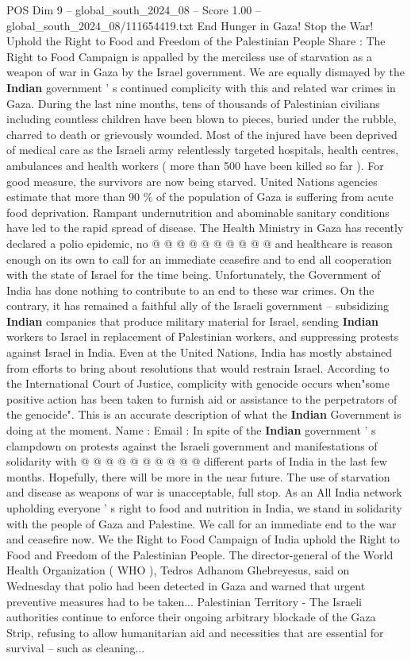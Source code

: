 \begin{textsample}{POS Dim 9 – global\_south\_2024\_08 – Score 1.00 – global\_south\_2024\_08/111654419.txt}  \label{ex:f9_pos_060}
End Hunger in Gaza!
Stop the War!
Uphold the Right to Food and Freedom of the Palestinian People Share : The Right to Food Campaign is appalled by the merciless use of starvation as a weapon of war in Gaza by the Israel government.
We are equally dismayed by the \textbf{Indian} government ' s continued complicity with this and related war crimes in Gaza.
During the last nine months, tens of thousands of Palestinian civilians including countless children have been blown to pieces, buried under the rubble, charred to death or grievously wounded.
Most of the injured have been deprived of medical care as the Israeli army relentlessly targeted hospitals, health centres, ambulances and health workers ( more than 500 have been killed so far ).
For good measure, the survivors are now being starved.
United Nations agencies estimate that more than 90 \% of the population of Gaza is suffering from acute food deprivation.
Rampant undernutrition and abominable sanitary conditions have led to the rapid spread of disease.
The Health Ministry in Gaza has recently declared a polio epidemic, no @ @ @ @ @ @ @ @ @ @ and healthcare is reason enough on its own to call for an immediate ceasefire and to end all cooperation with the state of Israel for the time being.
Unfortunately, the Government of India has done nothing to contribute to an end to these war crimes.
On the contrary, it has remained a faithful ally of the Israeli government -- subsidizing \textbf{Indian} companies that produce military material for Israel, sending \textbf{Indian} workers to Israel in replacement of Palestinian workers, and suppressing protests against Israel in India.
Even at the United Nations, India has mostly abstained from efforts to bring about resolutions that would restrain Israel.
According to the International Court of Justice, complicity with genocide occurs when"some positive action has been taken to furnish aid or assistance to the perpetrators of the genocide".
This is an accurate description of what the \textbf{Indian} Government is doing at the moment.
Name : Email : In spite of the \textbf{Indian} government ' s clampdown on protests against the Israeli government and manifestations of solidarity with @ @ @ @ @ @ @ @ @ @ different parts of India in the last few months.
Hopefully, there will be more in the near future.
The use of starvation and disease as weapons of war is unacceptable, full stop.
As an All India network upholding everyone ' s right to food and nutrition in India, we stand in solidarity with the people of Gaza and Palestine.
We call for an immediate end to the war and ceasefire now.
We the Right to Food Campaign of India uphold the Right to Food and Freedom of the Palestinian People.
The director-general of the World Health Organization ( WHO ), Tedros Adhanom Ghebreyesus, said on Wednesday that polio had been detected in Gaza and warned that urgent preventive measures had to be taken...
Palestinian Territory - The Israeli authorities continue to enforce their ongoing arbitrary blockade of the Gaza Strip, refusing to allow humanitarian aid and necessities that are essential for survival -- such as cleaning...

\end{textsample}
